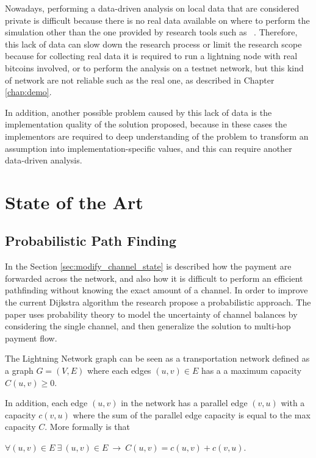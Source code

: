 Nowadays, performing a data-driven analysis on local data that are considered private
is difficult because there is no real data available on where to perform the simulation
other than the one provided by research tools such as ~\cite{lngossip}.
Therefore, this lack of data can slow down the research process or limit the 
research scope because for collecting real data it is required to run a lightning node 
with real bitcoins involved, or to perform the analysis on a 
testnet network, but this kind of network are not reliable such as 
the real one, as described in Chapter \ref{chap:demo}. 

In addition, another possible problem caused by this lack of data is the implementation
quality of the solution proposed, because in these cases 
the implementors are required to deep understanding of the problem 
to transform an assumption into implementation-specific values, 
and this can require another data-driven analysis.

\section{State of the Art}

\subsection{Probabilistic Path Finding}

In the Section \ref{sec:modify_channel_state} is described how the payment are
forwarded across the network, and also how it is difficult to perform an efficient 
pathfinding without knowing the exact amount of a channel. 
In order to improve the current Dijkstra algorithm the research \cite{DBLP:journals/corr/abs-2103-08576}
propose a probabilistic approach.
The paper \cite{DBLP:journals/corr/abs-2103-08576} uses probability theory to 
model the uncertainty of channel balances by considering the single channel, 
and then generalize the solution to multi-hop payment flow.

The Lightning Network graph can be seen as a transportation network 
defined as a graph $G = (V, E)$ where each edges $(u, v) \in E$ has a 
a maximum capacity $C(u, v) \ge 0$.

In addition, each edge $(u, v)$ in the network has a parallel edge $(v, u)$ 
with a capacity $c(v, u)$ where the sum of the parallel edge capacity is
equal to the max capacity $C$. More formally is that 

\begin{center}
    $\forall (u, v) \in E \: \exists \: (u, v) \in E \: \rightarrow \: C(u, v) = c(u, v) + c(v, u)$.
\end{center}

